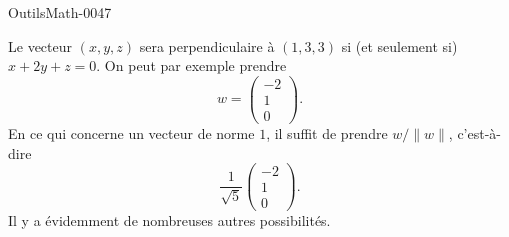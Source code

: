 
\begin{corrige}{OutilsMath-0047}

    Le vecteur $(x,y,z)$ sera perpendiculaire à $(1,3,3)$ si (et seulement si) $x+2y+z=0$. On peut par exemple prendre
    \begin{equation}
        w=\begin{pmatrix}
            -2    \\ 
            1    \\ 
            0    
        \end{pmatrix}.
    \end{equation}
    En ce qui concerne un vecteur de norme $1$, il suffit de prendre $w/\| w \|$, c'est-à-dire
    \begin{equation}
        \frac{1}{ \sqrt{5} }\begin{pmatrix}
            -2    \\ 
            1    \\ 
            0    
        \end{pmatrix}.
    \end{equation}
    Il y a évidemment de nombreuses autres possibilités.

\end{corrige}

